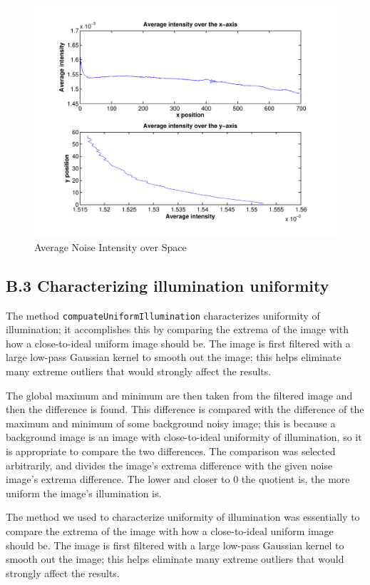 \documentclass{article}
\begin{document}
\begin{figure}[h]
\centering
\includegraphics[width=0.7\linewidth]{figures/noise_over_space.pdf}
\caption{Average Noise Intensity over Space}
\label{fig:noise_intensity_space}
\end{figure}


\subsection*{B.3 Characterizing illumination uniformity}

The method \texttt{compuateUniformIllumination} characterizes uniformity of illumination; it accomplishes this by comparing the extrema of the image with how a close-to-ideal uniform image should be. The image is first filtered with a large low-pass Gaussian kernel to smooth out the image; this helps eliminate many extreme outliers that would strongly affect the results.

The global maximum and minimum are then taken from the filtered image and then the difference is found. This difference is compared with the difference of the maximum and minimum of some background noisy image; this is because a background image is an image with close-to-ideal uniformity of illumination, so it is appropriate to compare the two differences. The comparison was selected arbitrarily, and divides the image's extrema difference with the given noise image's extrema difference. The lower and closer to 0 the quotient is, the more uniform the image's illumination is.

The method we used to characterize uniformity of illumination was essentially to compare the extrema of the image with how a close-to-ideal uniform image should be. The image is first filtered with a large low-pass Gaussian kernel to smooth out the image; this helps eliminate many extreme outliers that would strongly affect the results.
\end{document}
